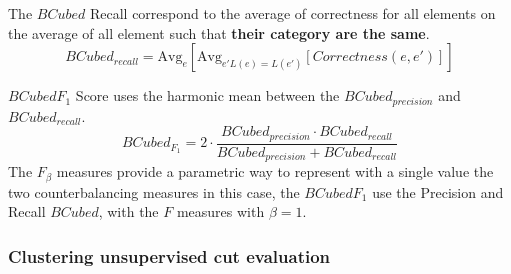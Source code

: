 \begin{definition}
  The $BCubed$ Recall correspond to the average of correctness for all elements on the average of all element such that \textbf{their category are the same}.
  \begin{equation}
    BCubed_{recall} = \text{Avg}_{e}[\text{Avg}_{e' L(e)=L(e')}[Correctness(e, e')]]
  \end{equation}
\end{definition}

\begin{definition}
  $BCubed F_1$ Score uses the harmonic mean between the $BCubed_{precision}$ and $BCubed_{recall}$.
  \begin{equation}
    BCubed_{F_1} =
    2 \cdot \frac{BCubed_{precision} \cdot BCubed_{recall}}
    {BCubed_{precision} + BCubed_{recall}}
  \end{equation}
  The $F_\beta$ measures provide a parametric way to represent with a single value the two counterbalancing measures in this case, the $BCubed F_1$ use the Precision and Recall $BCubed$, with the $F$ measures with $\beta = 1$.
\end{definition}

\subsubsection{Clustering unsupervised cut evaluation}
